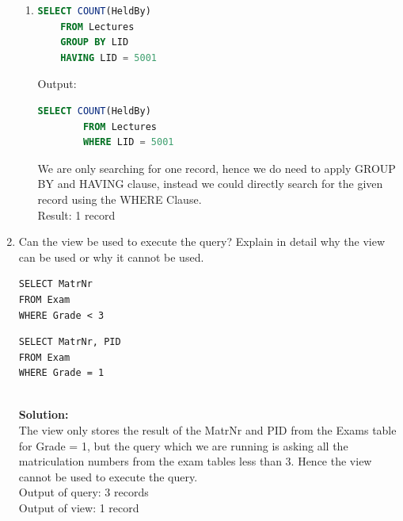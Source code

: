 \begin{enumerate}
\begin{enumerate}
  \item
    \begin{lstlisting}[language=sql]
    SELECT COUNT(HeldBy)
    FROM Lectures
    GROUP BY LID
    HAVING LID = 5001
    \end{lstlisting}

    Output:
    \begin{lstlisting}[language=sql]
		SELECT COUNT(HeldBy)
		FROM Lectures
		WHERE LID = 5001
    \end{lstlisting}

	  We are only searching for one record, hence we do need to apply GROUP BY and HAVING clause, instead we could directly search for the given record using the WHERE Clause.\\
    Result: 1 record


  \end{enumerate}
\newpage
\item 
 Can the view be used to execute the query? Explain in detail why the view can be used or why it cannot be used.

\begin{minipage}{0.4\columnwidth}
\end{minipage}
\begin{minipage}{0.4\columnwidth}
\end{minipage}

\begin{minipage}{0.4\columnwidth}
\begin{verbatim}
SELECT MatrNr
FROM Exam
WHERE Grade < 3

\end{verbatim}
\end{minipage}
\begin{minipage}{0.4\columnwidth}
\begin{verbatim}
SELECT MatrNr, PID
FROM Exam
WHERE Grade = 1
\end{verbatim}
\end{minipage}\\
{\bf Solution:}\\
The view only stores the result of the MatrNr and PID from the Exams table for Grade = 1, but the query which we are running is asking all the matriculation numbers from the exam tables less than 3.
Hence the view cannot be used to execute the query.\\

Output of query: 3 records\\
Output of view: 1 record

\end{enumerate}

